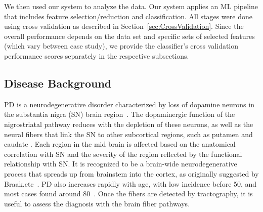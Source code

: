 We then used our system to analyze the data. Our system applies an ML pipeline that includes feature selection/reduction and classification. All stages were done using cross validation as described in
Section~\ref{sec:CrossValidation}. Since the overall performance depends on the data set and specific sets of selected features (which vary between case study), we provide the classifier's cross validation performance scores separately in the respective subsections.


\subsection{Disease Background}

\noindent PD is a neurodegenerative disorder characterized by loss of dopamine neurons in the substantia nigra (SN) brain region~\cite{prakash2012asymmetrical}. The dopaminergic function of the nigrostriatal pathway reduces with the depletion of these neurons, as well as the neural fibers that link the SN to other subcortical regions, such as putamen and caudate \cite{zhang2015diffusion}. Each region in the mid brain is affected based on the anatomical correlation with SN and the severity of the region reflected by the functional relationship with SN. %
It is recognized to be a brain-wide neurodegenerative process that spreads up from brainstem into the cortex, as originally suggested by Braak.etc~\cite{yau2018network}. %
PD also increases rapidly with age, with low incidence before 50, and most cases found around 80~\cite{ASCHERIO20161257}. Once the fibers are detected by tractography, it is useful to assess the diagnosis with the brain fiber pathways. 




